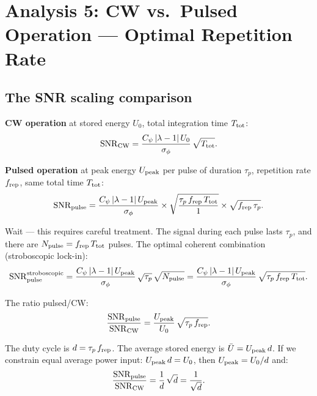\documentclass[11pt]{article}
\newcommand{\lam}{\lambda}
\begin{document}
\section{Analysis 5: CW vs.\ Pulsed Operation --- Optimal Repetition Rate}
\label{sec:pulsed}

\subsection{The SNR scaling comparison}

\textbf{CW operation} at stored energy $U_0$, total integration time $T_{\rm tot}$:
\begin{equation}
{\rm SNR}_{\rm CW} = \frac{C_\psi\,|\lam-1|\,U_0}{\sigma_\phi}\,\sqrt{T_{\rm tot}}.
\end{equation}

\textbf{Pulsed operation} at peak energy $U_{\rm peak}$ per pulse of duration
$\tau_p$, repetition rate $f_{\rm rep}$, same total time $T_{\rm tot}$:
\begin{equation}
{\rm SNR}_{\rm pulse} = \frac{C_\psi\,|\lam-1|\,U_{\rm peak}}{\sigma_\phi}
\times \sqrt{\frac{\tau_p\,f_{\rm rep}\,T_{\rm tot}}{1}}
\times \sqrt{f_{\rm rep}\,\tau_p}.
\end{equation}

Wait --- this requires careful treatment. The signal during each pulse lasts
$\tau_p$, and there are $N_{\rm pulse} = f_{\rm rep}\,T_{\rm tot}$ pulses.
The optimal coherent combination (stroboscopic lock-in):
\begin{equation}
{\rm SNR}_{\rm pulse}^{\rm stroboscopic} = \frac{C_\psi\,|\lam-1|\,U_{\rm peak}}
{\sigma_\phi}\,\sqrt{\tau_p}\,\sqrt{N_{\rm pulse}}
= \frac{C_\psi\,|\lam-1|\,U_{\rm peak}}{\sigma_\phi}
\,\sqrt{\tau_p\,f_{\rm rep}\,T_{\rm tot}}.
\end{equation}

The ratio pulsed/CW:
\begin{equation}
\frac{{\rm SNR}_{\rm pulse}}{{\rm SNR}_{\rm CW}}
= \frac{U_{\rm peak}}{U_0}\,\sqrt{\tau_p\,f_{\rm rep}}.
\end{equation}

The duty cycle is $d = \tau_p\,f_{\rm rep}$. The average stored energy is
$\bar{U} = U_{\rm peak}\,d$. If we constrain equal average power input:
$U_{\rm peak}\,d = U_0$, then $U_{\rm peak} = U_0/d$ and:
\begin{equation}
\frac{{\rm SNR}_{\rm pulse}}{{\rm SNR}_{\rm CW}}
= \frac{1}{d}\,\sqrt{d} = \frac{1}{\sqrt{d}}.
\end{equation}
\end{document}
